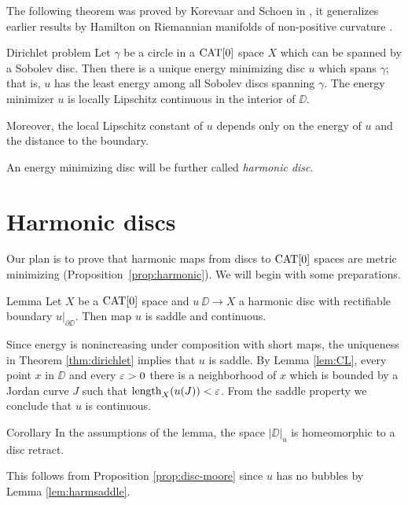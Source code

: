 \documentclass{article}
\begin{document}
The following theorem was proved by Korevaar and Schoen in \cite{KS}, it generalizes earlier results by Hamilton on 
Riemannian manifolds of non-positive
curvature \cite{H}.

\begin{thm}{Dirichlet problem}\label{thm:dirichlet}
Let $\gamma$ be a circle in a $\mathop{\rm CAT}\nolimits[0]$ space $X$ which can be spanned by a Sobolev disc. 
Then there is a unique energy minimizing disc $u$ which spans $\gamma$; 
that is, $u$
has the least energy among all Sobolev discs spanning $\gamma$. 
The energy minimizer $u$ is locally Lipschitz continuous in the interior of $\DD$.

Moreover, the local Lipschitz constant of $u$ depends only on the energy of $u$ and the distance to the boundary.
\end{thm}

An energy minimizing disc will be further called \emph{harmonic disc}.


\section{Harmonic discs}

Our plan is to prove that harmonic maps from discs to $\mathop{\rm CAT}\nolimits[0]$ spaces are metric minimizing (Proposition~\ref{prop:harmonic}).
We will begin with some preparations. 


\begin{thm}{Lemma}\label{lem:harmsaddle}
Let $X$ be a $\mathop{\rm CAT}\nolimits[0]$ space and
$u\:\DD\to X$ a harmonic disc with rectifiable boundary $u|_{\partial \DD}$.
Then map $u$ is saddle and continuous.
\end{thm}

Since energy is nonincreasing under composition with short maps, 
the uniqueness in Theorem \ref{thm:dirichlet} implies that
$u$ is saddle. 
By Lemma \ref{lem:CL}, every point $x$ in $\DD$ and every $\varepsilon>0$
there is a neighborhood of $x$ which is bounded by a Jordan curve $J$ such that $\mathop{\rm length}\nolimits_X(u(J))<\varepsilon$. From the saddle property we conclude 
that $u$ is continuous.
\qeds

\begin{thm}{Corollary}\label{cor:harmdiscretract}
In the assumptions of the lemma, the space $|\DD|_u$ is homeomorphic to a disc retract.
\end{thm}
This follows from Proposition \ref{prop:disc-moore} since $u$ has no bubbles 
by Lemma \ref{lem:harmsaddle}.
\qeds
\end{document}
